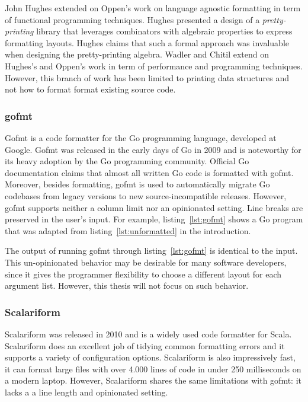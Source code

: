 John Hughes extended on Oppen's work on language agnostic formatting in term of functional programming techniques\autocite{hughes_design_1995}.
Hughes presented a design of a \emph{pretty-printing} library that leverages combinators with algebraic properties to express formatting layouts.
Hughes claims that such a formal approach was invaluable when designing the pretty-printing algebra.
Wadler\autocite{wadler_prettier_2003} and Chitil\autocite{swierstra_linear_2009} extend on Hughes's and Oppen's work in term of performance and programming techniques.
However, this branch of work has been limited to printing data structures and not how to format format existing source code.

\subsubsection{gofmt}
Gofmt\autocite{gofmt94:online} is a code formatter for the Go programming language, developed at Google.
Gofmt was released in the early days of Go in 2009 and is noteworthy for its heavy adoption by the Go programming community.
Official Go documentation\autocite{CodeR59:online} claims that almost all written Go code is formatted with gofmt.
Moreover, besides formatting, gofmt is used to automatically migrate Go codebases from legacy versions to new source-incompatible releases.
However, gofmt supports neither a column limit nor an opinionated setting.
Line breaks are preserved in the user's input.
For example, listing~\ref{lst:gofmt} shows a Go program that was adapted from listing~\ref{lst:unformatted} in the introduction.

The output of running gofmt through listing~\ref{lst:gofmt} is identical to the input.
This un-opinionated behavior may be desirable for many software developers,
since it gives the programmer flexibility to choose a different layout for each argument list.
However, this thesis will not focus on such behavior.

\subsubsection{Scalariform}
Scalariform\autocite{russell_scalariform_2010} was released in 2010 and is a widely used code formatter for Scala.
Scalariform does an excellent job of tidying common formatting errors and it supports a variety of configuration options.
Scalariform is also impressively fast, it can format large files with over 4.000 lines of code in under 250 milliseconds on a modern laptop.
However, Scalariform shares the same limitations with gofmt: it lacks a a line length and opinionated setting.

